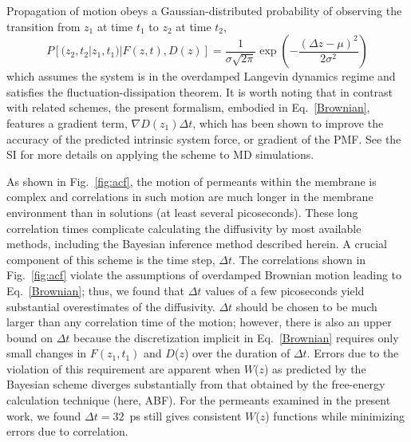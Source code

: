 Propagation of motion obeys a Gaussian-distributed probability of observing the
transition from $z_1$ at time $t_1$ to $z_2$ at time $t_2$,
\begin{equation}
\label{eq:Gaussian}
P[(z_2, t_2 | z_1, t_1) | F(z,t), D(z)] =
\frac{1}{\sigma \sqrt{ 2 \pi}}
\exp \left(-\frac{(\Delta z - \mu)^2}{2 \sigma^2} \right)
\end{equation}
which assumes the system is in the overdamped Langevin dynamics regime and satisfies the
fluctuation-dissipation theorem.
It is worth noting that in contrast with related
schemes, the present formalism, embodied in Eq.~\ref{Brownian}, features
a gradient term, $\nabla D(z_1) \Delta t$, which has been shown to improve
the accuracy of the predicted intrinsic system force, or gradient of the PMF.
See the SI for more details on applying the scheme
to MD simulations.

As shown in Fig.~\ref{fig:acf}, the motion of permeants within the membrane is complex and correlations in such motion are much longer in the membrane environment than in solutions (at least several picoseconds).
These long correlation times complicate calculating the diffusivity by most
available methods, including the Bayesian inference method described herein.
A crucial component of this scheme is the time step, $\Delta t$.
The correlations shown in Fig.~\ref{fig:acf} violate the assumptions of
overdamped Brownian motion leading to Eq.~\ref{Brownian}; thus,
we found that $\Delta t$ values of a few picoseconds yield substantial overestimates of the diffusivity.
$\Delta t$ should be chosen to be much larger than any correlation
time of the motion; however, there is also an upper bound on $\Delta t$ because
the discretization implicit in Eq.~\ref{Brownian} requires
only small changes in $F(z_1, t_1)$ and $D$($z$) over the duration of $\Delta t$.
Errors due to the violation of this requirement are apparent when
$W$($z$) as predicted by the Bayesian scheme diverges substantially
from that obtained by the free-energy calculation technique
(here, ABF).
For the permeants examined in the present work,
we found $\Delta t=32$~ps still gives consistent $W$($z$)
functions while minimizing errors due to correlation.

